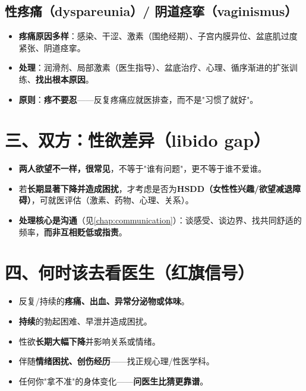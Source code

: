 \documentclass[12pt,UTF8,openany]{ctexbook}
\begin{document}
\subsection*{性疼痛（dyspareunia）/ 阴道痉挛（vaginismus）}
\begin{itemize}[leftmargin=2em,itemsep=0.3em]
  \item \textbf{疼痛原因多样}：感染、干涩、激素（围绝经期）、子宫内膜异位、盆底肌过度紧张、阴道痉挛。
  \item \textbf{处理}：润滑剂、局部激素（医生指导）、盆底治疗、心理、循序渐进的扩张训练、\textbf{找出根本原因}。
  \item \textbf{原则}：\textbf{疼不要忍}——反复疼痛应就医排查，而不是"习惯了就好"。
\end{itemize}

\section{三、双方：性欲差异（libido gap）}

\begin{itemize}[leftmargin=2em,itemsep=0.3em]
  \item \textbf{两人欲望不一样，很常见}，不等于"谁有问题"，更不等于谁不爱谁。
  \item 若\textbf{长期显著下降并造成困扰}，才考虑是否为\textbf{HSDD（女性性兴趣/欲望减退障碍）}，可就医评估（激素、药物、心理、关系）。
  \item \textbf{处理核心是沟通}（见\ref{chap:communication}）：谈感受、谈边界、找共同舒适的频率，\textbf{而非互相贬低或指责}。
\end{itemize}

\section{四、何时该去看医生（红旗信号）}

\begin{itemize}[leftmargin=2em,itemsep=0.3em]
  \item 反复/持续的\textbf{疼痛、出血、异常分泌物或体味}。
  \item \textbf{持续}的勃起困难、早泄并造成困扰。
  \item 性欲\textbf{长期大幅下降}并影响关系或情绪。
  \item 伴随\textbf{情绪困扰、创伤经历}——找正规心理/性医学科。
  \item 任何你"拿不准"的身体变化——\textbf{问医生比猜更靠谱}。
\end{itemize}
\end{document}
